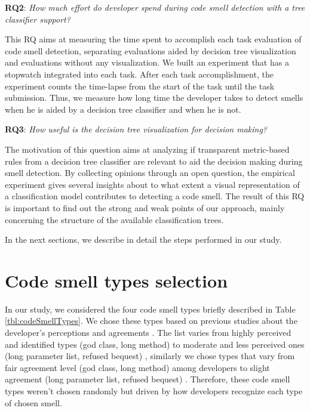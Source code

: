 \textbf{RQ2}: \textit{How much effort do developer spend during code smell detection with a tree classifier support?}

This RQ aims at measuring the time spent to accomplish each task evaluation of code smell detection, separating evaluations aided by decision tree visualization and evaluations without any visualization. We built an experiment that has a stopwatch integrated into each task. After each task accomplishment, the experiment counts the time-lapse from the start of the task until the task submission. Thus, we measure how long time the developer takes to detect smells when he is aided by a decision tree classifier and when he is not.

\textbf{RQ3}: \textit{How useful is the decision tree visualization for decision making?}

The motivation of this question aims at analyzing if transparent metric-based rules from a decision tree classifier are relevant to aid the decision making during smell detection. By collecting opinions through an open question, the empirical experiment gives several insights about to what extent a visual representation of a classification model contributes to detecting a code smell. The result of this RQ is important to find out the strong and weak points of our approach, mainly concerning the structure of the available classification trees.

In the next sections, we describe in detail the steps performed in our study.

\section{Code smell types selection} \label{sec:codeSmellTypes}

In our study, we considered the four code smell types briefly described in Table \ref{tbl:codeSmellTypes}. We chose these types based on previous studies about the developer’s perceptions \cite{palomba2014they}  and agreements \cite{hozano2018you}. The list
varies from highly perceived and identified types (god class, long
method) to moderate and less perceived ones (long parameter list,
refused bequest) \cite{palomba2014they}, similarly we chose types that vary from fair
agreement level (god class, long method) among developers to
slight agreement (long parameter list, refused bequest) \cite{hozano2018you}. Therefore, these code smell types weren't chosen randomly but driven by how developers recognize each type of chosen smell.

